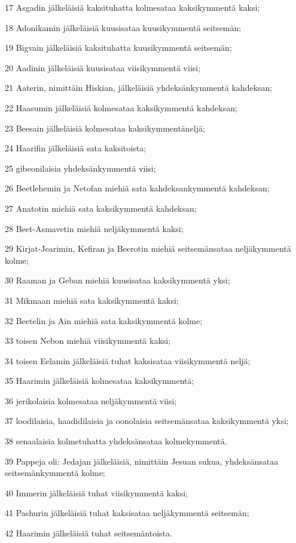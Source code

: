 \par 17 Asgadin jälkeläisiä kaksituhatta kolmesataa kaksikymmentä kaksi;
\par 18 Adonikamin jälkeläisiä kuusisataa kuusikymmentä seitsemän;
\par 19 Bigvain jälkeläisiä kaksituhatta kuusikymmentä seitsemän;
\par 20 Aadinin jälkeläisiä kuusisataa viisikymmentä viisi;
\par 21 Aaterin, nimittäin Hiskian, jälkeläisiä yhdeksänkymmentä kahdeksan;
\par 22 Haasumin jälkeläisiä kolmesataa kaksikymmentä kahdeksan;
\par 23 Beesain jälkeläisiä kolmesataa kaksikymmentäneljä;
\par 24 Haarifin jälkeläisiä sata kaksitoista;
\par 25 gibeonilaisia yhdeksänkymmentä viisi;
\par 26 Beetlehemin ja Netofan miehiä sata kahdeksankymmentä kahdeksan;
\par 27 Anatotin miehiä sata kaksikymmentä kahdeksan;
\par 28 Beet-Asmavetin miehiä neljäkymmentä kaksi;
\par 29 Kirjat-Jearimin, Kefiran ja Beerotin miehiä seitsemänsataa neljäkymmentä kolme;
\par 30 Raaman ja Geban miehiä kuusisataa kaksikymmentä yksi;
\par 31 Mikmaan miehiä sata kaksikymmentä kaksi;
\par 32 Beetelin ja Ain miehiä sata kaksikymmentä kolme;
\par 33 toisen Nebon miehiä viisikymmentä kaksi;
\par 34 toisen Eelamin jälkeläisiä tuhat kaksisataa viisikymmentä neljä;
\par 35 Haarimin jälkeläisiä kolmesataa kaksikymmentä;
\par 36 jerikolaisia kolmesataa neljäkymmentä viisi;
\par 37 loodilaisia, haadidilaisia ja oonolaisia seitsemänsataa kaksikymmentä yksi;
\par 38 senaalaisia kolmetuhatta yhdeksänsataa kolmekymmentä.
\par 39 Pappeja oli: Jedajan jälkeläisiä, nimittäin Jesuan sukua, yhdeksänsataa seitsemänkymmentä kolme;
\par 40 Immerin jälkeläisiä tuhat viisikymmentä kaksi;
\par 41 Pashurin jälkeläisiä tuhat kaksisataa neljäkymmentä seitsemän;
\par 42 Haarimin jälkeläisiä tuhat seitsemäntoista.
